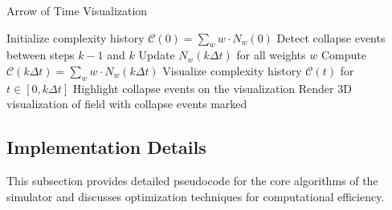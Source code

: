 \documentclass[11pt,a4paper]{article}
\begin{document}
\begin{algorithm}
\caption{Arrow of Time Visualization}
\label{alg:arrow_of_time}
\begin{algorithmic}[1]
    \State Initialize complexity history $\mathcal{C}(0) = \sum_w w \cdot N_w(0)$
        \State Detect collapse events between steps $k-1$ and $k$
        \State Update $N_w(k\Delta t)$ for all weights $w$
        \State Compute $\mathcal{C}(k\Delta t) = \sum_w w \cdot N_w(k\Delta t)$
        \State Visualize complexity history $\mathcal{C}(t)$ for $t \in [0, k\Delta t]$
        \State Highlight collapse events on the visualization
        \State Render 3D visualization of field with collapse events marked
    \EndFor
\EndProcedure
\end{algorithmic}
\end{algorithm}

\subsection{Implementation Details}
\label{subsec:implementation_details}

This subsection provides detailed pseudocode for the core algorithms of the simulator and discusses optimization techniques for computational efficiency.
\end{document}
